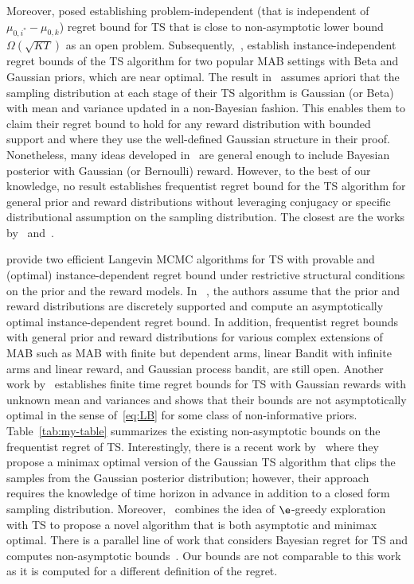 \documentclass[11pt]{article}
\begin{document}
Moreover, \cite{li2012open} posed establishing problem-independent (that is independent of $\mu_{0,i^*} - \mu_{0,k}$) regret bound for TS that is close to non-asymptotic lower bound $\Omega(\sqrt{KT})$ as an open problem. Subsequently,~\cite{agrawal2013further}, establish instance-independent regret bounds  of the TS algorithm for two popular MAB settings with Beta and Gaussian priors, which are near optimal. The result in~\cite{agrawal2013further} assumes apriori that the sampling distribution at each stage of their TS algorithm is Gaussian (or Beta) with mean and variance updated in a non-Bayesian fashion. This enables them to claim their regret bound to hold for any reward distribution with bounded support and where they use the well-defined Gaussian structure in their proof. Nonetheless, many ideas developed in~\cite{agrawal2013further} are general enough to include Bayesian posterior with Gaussian (or Bernoulli) reward.  However, to the best of our knowledge, no result establishes frequentist regret bound for the TS algorithm for general prior and reward distributions without leveraging conjugacy or specific distributional assumption on the sampling distribution. The closest are the works by~\cite{mazumdar20a} and~\cite{gopalan2013thompson}.

\cite{mazumdar20a} provide two efficient Langevin MCMC algorithms for TS with provable and (optimal) instance-dependent regret bound under restrictive structural conditions on the prior and the reward models. In ~\cite{gopalan2013thompson}, the authors assume that the prior and reward distributions are discretely supported and compute an asymptotically optimal instance-dependent regret bound. In addition, frequentist regret bounds with general prior and reward distributions for various complex extensions of MAB such as MAB with finite but dependent arms, linear Bandit with infinite arms and linear reward, and Gaussian process bandit, are still open. Another work by~\cite{honda2014optimality} establishes finite time regret bounds for TS with Gaussian rewards with unknown mean and variances and shows that their bounds are not asymptotically optimal in the sense of~\eqref{eq:LB} for some class of non-informative priors. Table~\ref{tab:my-table} summarizes the existing non-asymptotic bounds on the frequentist regret of TS. Interestingly, there is a recent work by~\cite{jin21d} where they propose a minimax optimal version of the Gaussian TS algorithm that clips the samples from the Gaussian posterior distribution; however, their approach requires the knowledge of time horizon in advance in addition to a closed form sampling distribution. Moreover,~\cite{jin2022finite,Tianyuan2023} combines the idea of $\e$-greedy exploration with TS to propose a novel algorithm that is both asymptotic and minimax optimal. There is a parallel line of work that considers Bayesian regret for TS and computes non-asymptotic bounds~\citep{russo2014learning}. Our bounds are not comparable to this work as it is computed for a different definition of the regret.  
\end{document}
